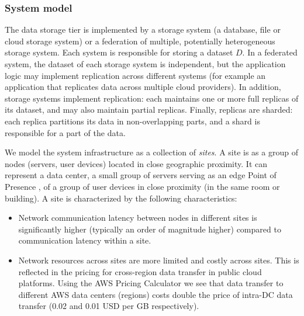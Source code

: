 \subsubsection{System model}
The data storage tier is implemented by a storage system (a database, file or cloud storage system) or a federation of
multiple, potentially heterogeneous storage system.
Each system is responsible for storing a dataset $D$.
In a federated system, the dataset of each storage system is independent, but the application logic may implement
replication across different systems (for example an application that replicates data across multiple cloud providers).
In addition, storage systems implement replication: each maintains one or more full replicas of its dataset, and may also
maintain partial replicas.
Finally, replicas are sharded: each replica partitions its data in non-overlapping parts, and a shard is responsible
for a part of the data.

We model the system infrastructure as a collection of \textit{sites}.
A site is as a group of nodes (servers, user devices) located in close geographic proximity.
It can represent a data center, a small group of servers serving as an edge Point of Presence \cite{google:infra}, of
a group of user devices in close proximity (in the same room or building).
A site is characterized by the following characteristics:
\begin{itemize}
  \item Network communication latency between nodes in different sites is significantly higher (typically an order of
  magnitude higher) \cite{pbailis:hats} compared to communication latency within a site.
  \item Network resources across sites are more limited and costly across sites.
  This is reflected in the pricing for cross-region data transfer in public cloud platforms.
  Using the AWS Pricing Calculator \cite{aws:costcalc} we see that data transfer to different AWS data centers
  (regions) costs double the price of intra-DC data transfer (0.02 and 0.01 USD per GB respectively).
\end{itemize}



